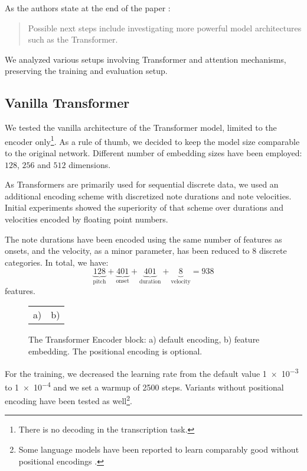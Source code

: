 As the authors state at the end of the paper \cite{Liu2022}: \begin{quote}Possible next steps include investigating more powerful model architectures such as the Transformer.\end{quote} We analyzed various setups involving Transformer and attention mechanisms, preserving the training and evaluation setup.

\subsection{Vanilla Transformer}

We tested the vanilla architecture of the Transformer model, limited to the encoder only\footnote{There is no decoding in the transcription task.}. As a rule of thumb, we decided to keep the model size comparable to the original network. Different number of embedding sizes have been employed: $128$, $256$ and $512$ dimensions. 

As Transformers are primarily used for sequential discrete data, we used an additional encoding scheme with discretized note durations and note velocities. Initial experiments showed the superiority of that scheme over durations and velocities encoded by floating point numbers.

The note durations have been encoded using the same number of features as onsets, and the velocity, as a minor parameter, has been reduced to 8 discrete categories. In total, we have: \[\underbrace{128}_{\textrm{pitch}}+\underbrace{401}_{\textrm{onset}}+\underbrace{401}_{\textrm{duration}}+\underbrace{8}_{\textrm{velocity}} = 938\] features.

\begin{figure}[ht!]
\centering
\begin{tabular}{cc}a)
 & b)

\end{tabular}
\caption[The Transformer Encoder block.]{The Transformer Encoder block: a) default encoding, b) feature embedding. The positional encoding is optional.}
\end{figure}

For the training, we decreased the learning rate from the default value \num{1e-3} to \num{1e-4} and we set a warmup of 2500 steps. Variants without positional encoding have been tested as well\footnote{Some language models have been reported to learn comparably good without positional encodings \cite{Haviv2022}.}.

